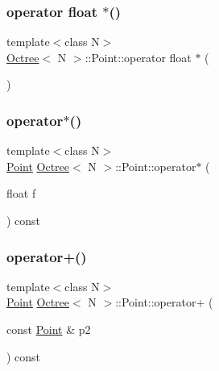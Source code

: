 \subsubsection{\texorpdfstring{operator float $\ast$()}{operator float *()}}
{\footnotesize\ttfamily template$<$class N$>$ \\
\hyperlink{classOctree}{Octree}$<$ N $>$\+::Point\+::operator float $\ast$ (\begin{DoxyParamCaption}{ }\end{DoxyParamCaption})\hspace{0.3cm}{\ttfamily [inline]}}

\mbox{\label{structOctree_1_1Point_ab39615ca08e620c9e33f83ca7202c7cd}} 
\subsubsection{\texorpdfstring{operator$\ast$()}{operator*()}}
{\footnotesize\ttfamily template$<$class N$>$ \\
\hyperlink{structOctree_1_1Point}{Point} \hyperlink{classOctree}{Octree}$<$ N $>$\+::Point\+::operator$\ast$ (\begin{DoxyParamCaption}\item[{float}]{f }\end{DoxyParamCaption}) const\hspace{0.3cm}{\ttfamily [inline]}}

\mbox{\label{structOctree_1_1Point_ad973b650a63bf4d1cb27cc1283f922a5}} 
\subsubsection{\texorpdfstring{operator+()}{operator+()}}
{\footnotesize\ttfamily template$<$class N$>$ \\
\hyperlink{structOctree_1_1Point}{Point} \hyperlink{classOctree}{Octree}$<$ N $>$\+::Point\+::operator+ (\begin{DoxyParamCaption}\item[{const \hyperlink{structOctree_1_1Point}{Point} \&}]{p2 }\end{DoxyParamCaption}) const\hspace{0.3cm}{\ttfamily [inline]}}

